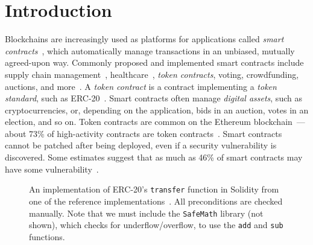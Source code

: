 \documentclass[nonacm, dvipsnames, sigconf]{acmart}
\begin{document}


\maketitle

\section{Introduction}


Blockchains are increasingly used as platforms for applications called \emph{smart contracts}~\cite{Szabo97:Formalizing}, which automatically manage transactions in an unbiased, mutually agreed-upon way.
Commonly proposed and implemented smart contracts include supply chain management~\cite{SupplyChainUse}, healthcare~\cite{HealthcareUse}, \emph{token contracts}, voting, crowdfunding, auctions, and more~\cite{Elsden18:Making}.
A \emph{token contract} is a contract implementing a \emph{token standard}, such as ERC-20~\cite{erc20}.
Smart contracts often manage \emph{digital assets}, such as cryptocurrencies, or, depending on the application, bids in an auction, votes in an election, and so on.
Token contracts are common on the Ethereum blockchain~\cite{wood2014ethereum}---about 73\% of high-activity contracts are token contracts~\cite{OlivaEtAl2019}.
Smart contracts cannot be patched after being deployed, even if a security vulnerability is discovered.
Some estimates suggest that as much as 46\% of smart contracts may have some vulnerability~\cite{luuOyente}.
\begin{figure}
    \centering
    
    \vspace{-1em}
    \caption{An implementation of ERC-20's \lstinline{transfer} function in Solidity from one of the reference implementations~\cite{erc20Consensys}.
        All preconditions are checked manually.
        Note that we must include the \lstinline{SafeMath} library (not shown), which checks for underflow/overflow, to use the \lstinline{add} and \lstinline{sub} functions.}
    \label{fig:erc20-transfer-sol}
\end{figure}
\end{document}

